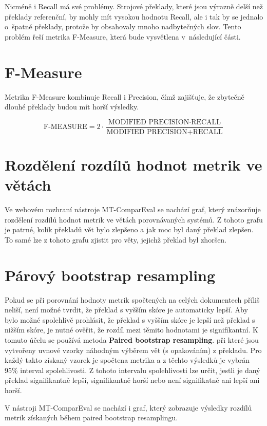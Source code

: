 Nicméně i Recall má své problémy.
Strojové překlady,
  které jsou výrazně delší než překlady referenční,
  by mohly mít vysokou hodnotu Recall,
  ale i tak by se jednalo o~špatné překlady,
  protože by obsahovaly mnoho nadbytečných slov. 
Tento problém řeší metrika F-Measure,
  která bude vysvětlena v~následující části.

\section{F-Measure}
Metrika F-Measure kombinuje Recall i Precision,
  čímž zajišťuje, 
  že zbytečně dlouhé překlady budou mít horší výsledky.

$$ \text{F-MEASURE} = 2 \cdot \frac{\text{MODIFIED PRECISION} \cdot \text{RECALL}}{\text{MODIFIED PRECISION} + \text{RECALL}} $$


\section{Rozdělení rozdílů hodnot metrik ve větách}
Ve webovém rozhraní nástroje \mbox{MT-ComparEval} se nachází graf,
  který znázorňuje rozdělení rozdílů hodnot metrik ve větách porovnávaných systémů.
Z tohoto grafu je patrné, kolik překladů vět bylo zlepšeno a jak moc byl daný překlad zlepšen.
To samé lze z tohoto grafu zjistit pro věty, jejichž překlad byl zhoršen.

\section{Párový bootstrap resampling}
Pokud se při porovnání hodnoty metrik spočtených na celých dokumentech příliš neliší,
  není možné tvrdit, že překlad s vyšším skóre je automaticky lepší.
Aby bylo možné spolehlivě prohlásit, že překlad s vyšším skóre je lepší než překlad s nižším skóre,
  je nutné ověřit, že rozdíl mezi těmito hodnotami je signifikantní.
K tomuto účelu se používá metoda \textbf{Paired bootstrap resampling}. %
  při které jsou vytvořeny uv{nové} vzorky náhodným výběrem vět (s opakováním) z překladu.
Pro každý takto získaný vzorek je spočtena metrika a z těchto výsledků je vybrán 95\% interval spolehlivosti.
Z tohoto intervalu spolehlivosti lze určit, jestli je daný překlad signifikantně lepší, signifikantně horší nebo není signifikatně ani lepší ani horší.

V nástroji \mbox{MT-ComparEval} se nachází i graf, který zobrazuje výsledky rozdílů metrik získaných během paired bootstrap resamplingu.




